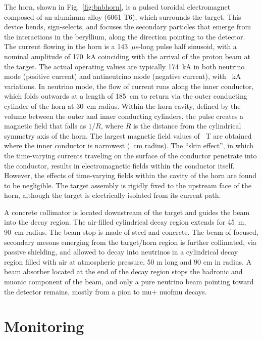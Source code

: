  The horn, shown in Fig.~\ref{fig:bnbhorn}, is a pulsed toroidal electromagnet composed of an aluminum %
 alloy (6061 T6), which surrounds the target.
 This device bends, sign-selects, and focuses the secondary particles that emerge from the interactions %
 in the beryllium, along the direction pointing to the detector.
 The current flowing in the horn is a 143~$\mu$s-long pulse half sinusoid, with a nominal amplitude of 170~kA %
 coinciding with the arrival of the proton beam at the target.
 The actual operating values are typically 174~kA in both neutrino mode (positive current) and antineutrino mode %
 (negative current), with ~kA variations.
 In neutrino mode, the flow of current runs along the inner conductor, which folds outwards at a length of %
 185~cm to return via the outer conducting cylinder of the horn at 30~cm radius.
 Within the horn cavity, defined by the volume between the outer and inner conducting cylinders, %
 the pulse creates a magnetic field that falls as $1/R$, where $R$ is the distance from the cylindrical symmetry %
 axis of the horn.
 The largest magnetic field values of ~T are obtained where the inner conductor is narrowest %
 (~cm radius).
 The ``skin effect'', in which the time-varying currents traveling on the surface of the conductor penetrate %
 into the conductor, results in electromagnetic fields within the conductor itself.
 However, the effects of time-varying fields within the cavity of the horn are found to be negligible.
 The target assembly is rigidly fixed to the upstream face of the horn, although the target is %
 electrically isolated from its current path.

 A concrete collimator is located downstream of the target and guides the beam into the decay region.
 The air-filled cylindrical decay region extends for 45~m, 90~cm radius. 
 The beam stop is made of steel and concrete. 
 The beam of focused, secondary mesons emerging from the target/horn region is further collimated, %
 via passive shielding, and allowed to decay into neutrinos in a cylindrical decay %
 region filled with air at atmospheric pressure, 50 m long and 90 cm in radius. 
 A beam absorber located at the end of the decay region stops the hadronic and muonic %
 component of the beam, and only a pure neutrino beam pointing toward the detector remains, %
 mostly from a pion to mu+ nuofmu decays.

 \section{Monitoring}
 \label{sec:monitor}

